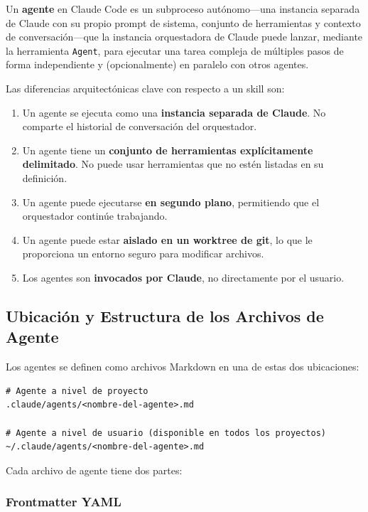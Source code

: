 \documentclass[11pt,letterpaper]{article}
\begin{document}
\begin{definitionbox}[title=Agente (Claude Code)]
Un \textbf{agente} en Claude Code es un subproceso autónomo---una instancia separada de Claude con su propio prompt de sistema, conjunto de herramientas y contexto de conversación---que la instancia orquestadora de Claude puede lanzar, mediante la herramienta \texttt{Agent}, para ejecutar una tarea compleja de múltiples pasos de forma independiente y (opcionalmente) en paralelo con otros agentes.
\end{definitionbox}

Las diferencias arquitectónicas clave con respecto a un skill son:
\begin{enumerate}[leftmargin=*]
    \item Un agente se ejecuta como una \textbf{instancia separada de Claude}. No comparte el historial de conversación del orquestador.
    \item Un agente tiene un \textbf{conjunto de herramientas explícitamente delimitado}. No puede usar herramientas que no estén listadas en su definición.
    \item Un agente puede ejecutarse \textbf{en segundo plano}, permitiendo que el orquestador continúe trabajando.
    \item Un agente puede estar \textbf{aislado en un worktree de git}, lo que le proporciona un entorno seguro para modificar archivos.
    \item Los agentes son \textbf{invocados por Claude}, no directamente por el usuario.
\end{enumerate}

\subsection{Ubicación y Estructura de los Archivos de Agente}

Los agentes se definen como archivos Markdown en una de estas dos ubicaciones:

\begin{lstlisting}[style=BashStyle, caption={Ubicaciones de los archivos de agente}]
# Agente a nivel de proyecto
.claude/agents/<nombre-del-agente>.md

# Agente a nivel de usuario (disponible en todos los proyectos)
~/.claude/agents/<nombre-del-agente>.md
\end{lstlisting}

Cada archivo de agente tiene dos partes:

\subsubsection{Frontmatter YAML}
\end{document}
